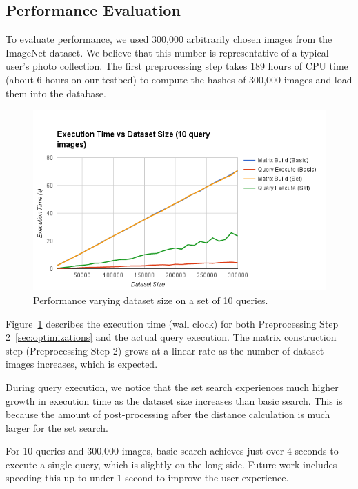 \subsection{Performance Evaluation}
To evaluate performance, we used 300,000 arbitrarily chosen images from the ImageNet dataset.
We believe that this number is representative of a typical user's photo collection.
The first preprocessing step takes 189 hours of CPU time (about 6 hours on our testbed) to compute the hashes of 300,000 images and load them into the database.

\begin{figure}[t]
    \begin{minipage}{1.0\columnwidth}
        \centering
        \includegraphics[width=0.9\columnwidth]{figs/vary-dataset}
    \end{minipage}
    \caption{Performance varying dataset size on a set of 10 queries.}
    \label{fig:vary-dataset}
\end{figure}
Figure~\ref{fig:vary-dataset} describes the execution time (wall clock) for both Preprocessing Step 2~\ref{sec:optimizations} and the actual query execution.
The matrix construction step (Preprocessing Step 2) grows at a linear rate as the number of dataset images increases, which is expected.

During query execution, we notice that the set search experiences much higher growth in execution time as the dataset size increases than basic search.
This is because the amount of post-processing after the distance calculation is much larger for the set search.

For 10 queries and 300,000 images, basic search achieves just over 4 seconds to execute a single query, which is slightly on the long side. Future work includes
speeding this up to under 1 second to improve the user experience.

